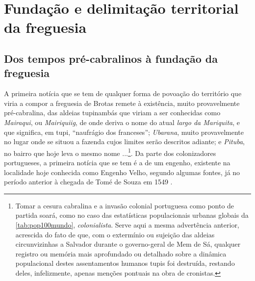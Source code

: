 \section{Fundação e delimitação territorial da freguesia}\label{sec:2.1}

\subsection{Dos tempos pré-cabralinos à fundação da freguesia}\label{subsec:precabral}

A primeira notícia que se tem de qualquer forma de povoação do território que viria a compor a freguesia de Brotas remete à existência, muito provavelmente pré-cabralina, das aldeias tupinambás que viriam a ser conhecidas como \textit{Mairaqui}, ou \textit{Mairiquiig}, de onde deriva o nome do atual \textit{largo da Mariquita}, e que significa, em tupi, ``naufrágio dos franceses''; \textit{Ubarana}, muito provavelmente no lugar onde se situou a fazenda cujos limites serão descritos adiante; e \textit{Pituba}, no bairro que hoje leva o mesmo nome \cite{azevedo_povoamento_1969,dorea_ruas_1999,sampaio_salvador_2016,VASCONCELOS2002}...\footnote{Tomar a cesura cabralina e a invasão colonial portuguesa como ponto de partida soará, como no caso das estatísticas populacionais urbanas globais da \autoref{tab:pop100mundo}, \textit{colonialista}. Serve aqui a mesma advertência anterior, acrescida do fato de que, com o extermínio ou sujeição das aldeias circunvizinhas a Salvador durante o governo-geral de Mem de Sá, qualquer registro ou memória mais aprofundado ou detalhado sobre a dinâmica populacional destes assentamentos humanos tupis foi destruída, restando deles, infelizmente, apenas menções pontuais na obra de cronistas.}. Da parte dos colonizadores portugueses, a primeira notícia que se tem é a de um engenho, existente na localidade hoje conhecida como Engenho Velho, segundo algumas fontes, já no período anterior à chegada de Tomé de Souza em 1549 \cite[p.~235]{sampaio_salvador_2016}.

